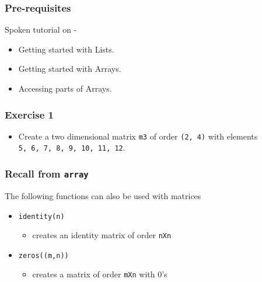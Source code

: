 \documentclass[17pt,compress]{beamer}
\begin{document}
\begin{frame}
\frametitle{Pre-requisites}
\label{sec-3}

  Spoken tutorial on -\pause

\begin{itemize}
\item Getting started with Lists.\pause
\item Getting started with Arrays.\pause
\item Accessing parts of Arrays.
\end{itemize}
\end{frame}
\begin{frame}
\frametitle{Exercise 1}
\label{sec-4}


\begin{itemize}
\item Create a two dimensional matrix \texttt{m3} of order \texttt{(2, 4)} with
   elements \\ \texttt{5, 6, 7, 8, 9, 10, 11, 12}.
\end{itemize}
\end{frame}
\begin{frame}
\frametitle{Recall from \texttt{array}}
\label{sec-5.1}

  The following functions can also be used with matrices\pause

\begin{itemize}
\item \texttt{identity(n)}
	\begin{itemize}
	\item creates an identity matrix of order \texttt{nXn}\pause
	\end{itemize}
\item \texttt{zeros((m,n))}
	\begin{itemize}
	\item creates a matrix of order \texttt{mXn} with 0's
	\end{itemize}
\end{itemize}
\end{frame}
\end{document}

